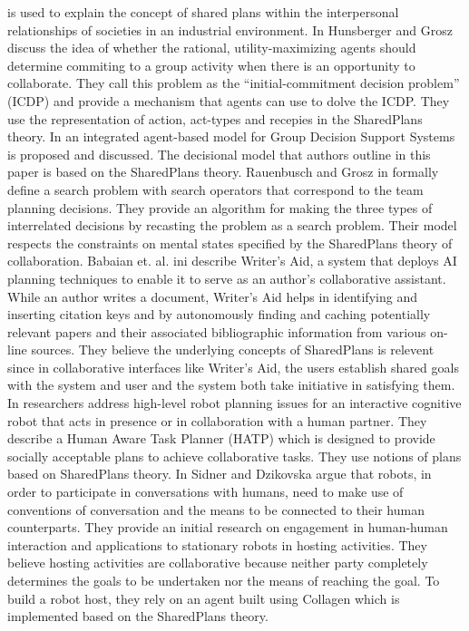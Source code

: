\documentclass[11pt]{article}
\begin{document}
\cite{grosz:plans-discourse} is used to explain the concept of shared plans
within the interpersonal relationships of societies in an industrial
environment. In \cite{hunsberger:auction-collaborative} Hunsberger and Grosz
discuss the idea of whether the rational, utility-maximizing agents should
determine commiting to a group activity when there is an opportunity to
collaborate. They call this problem as the ``initial-commitment decision
problem'' (ICDP) and provide a mechanism that agents can use to dolve the ICDP.
They use the representation of action, act-types and recepies in the SharedPlans
theory. In \cite{zamfirescu:gdss} an integrated agent-based model for Group
Decision Support Systems is proposed and discussed. The decisional model that
authors outline in this paper is based on the SharedPlans theory. Rauenbusch and
Grosz in \cite{rauenbusch:decision-making-planning} formally define a search
problem with search operators that correspond to the team planning decisions.
They provide an algorithm for making the three types of interrelated decisions
by recasting the problem as a search problem. Their model respects the
constraints on mental states specified by the SharedPlans theory of
collaboration. Babaian et. al. ini \cite{babaian:writers-assistant} describe
Writer’s Aid, a system that deploys AI planning techniques to enable it to serve
as an author’s collaborative assistant. While an author writes a document,
Writer’s Aid helps in identifying and inserting citation keys and by
autonomously finding and caching potentially relevant papers and their
associated bibliographic information from various on-line sources. They believe
the underlying concepts of SharedPlans is relevent since in collaborative
interfaces like Writer’s Aid, the users establish shared goals with the system
and user and the system both take initiative in satisfying them. In
\cite{montreuil:planning-robot-activity} researchers address high-level robot
planning issues for an interactive cognitive robot that acts in presence or in
collaboration with a human partner. They describe a Human Aware Task Planner
(HATP) which is designed to provide socially acceptable plans to achieve
collaborative tasks. They use notions of plans based on SharedPlans theory. In
\cite{sidner:enagagement-robot} Sidner and Dzikovska argue that robots, in order
to participate in conversations with humans, need to make use of conventions of
conversation and the means to be connected to their human counterparts. They
provide an initial research on engagement in human-human interaction and
applications to stationary robots in hosting activities. They believe hosting
activities are collaborative because neither party completely determines the
goals to be undertaken nor the means of reaching the goal. To build a robot
host, they rely on an agent built using Collagen which is implemented based on
the SharedPlans theory.\\
\end{document}
